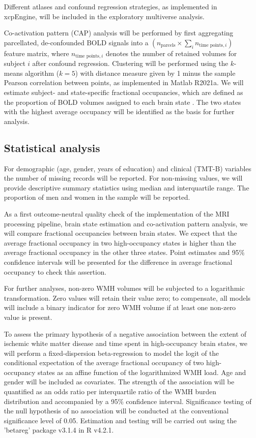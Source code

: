 Different atlases and confound regression strategies, as implemented in xcpEngine, will be included in the exploratory multiverse analysis.

Co-activation pattern (CAP) analysis will be performed by first aggregating parcellated, de-confounded BOLD signals into a $\left(n_{\text{parcels}}\times \sum_i{n_{\text{time points}, i}}\right)$ feature matrix, where $n_{\text{time points}, i}$ denotes the number of retained volumes for subject $i$ after confound regression.
Clustering will be performed using the $k$-means algorithm ($k=5$) with distance measure given by 1 minus the sample Pearson correlation between points, as implemented in Matlab R2021a.
We will estimate subject- and state-specific fractional occupancies, which are defined as the proportion of BOLD volumes assigned to each brain state \citep{Vidaurre2018-pb}. 
The two states with the highest average occupancy will be identified as the basis for further analysis.


\subsection{Statistical analysis}
For demographic (age, gender, years of education) and clinical (TMT-B) variables the number of missing records will be reported.
For non-missing values, we will provide descriptive summary statistics using median and interquartile range.
The proportion of men and women in the sample will be reported.

As a first outcome-neutral quality check of the implementation of the MRI processing pipeline, brain state estimation and co-activation pattern analysis, we will compare fractional occupancies between brain states.
We expect that the average fractional occupancy in two high-occupancy states is higher than the average fractional occupancy in the other three states.
Point estimates and 95\% confidence intervals will be presented for the difference in average fractional occupancy to check this assertion.

For further analyses, non-zero WMH volumes will be subjected to a logarithmic transformation.
Zero values will retain their value zero; to compensate, all models will include a binary indicator for zero WMH volume if at least one non-zero value is present.

To assess the primary hypothesis of a negative association between the extent of ischemic white matter disease and time spent in high-occupancy brain states, we will perform a fixed-dispersion beta-regression to model the logit of the conditional expectation of the average fractional occupancy of two high-occupancy states as an affine function of the logarithmized WMH load.
Age and gender will be included as covariates.
The strength of the association will be quantified as an odds ratio per interquartile ratio of the WMH burden distribution and accompanied by a 95\% confidence interval.
Significance testing of the null hypothesis of no association will be conducted at the conventional significance level of 0.05.
Estimation and testing will be carried out using the 'betareg' package v3.1.4 in R v4.2.1.

